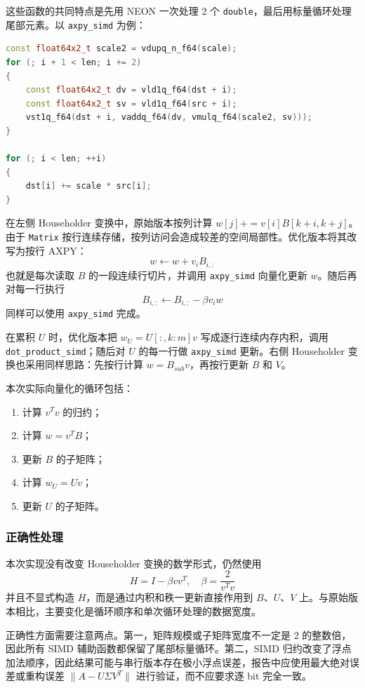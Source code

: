 \documentclass[UTF8,a4paper]{ctexart}
\begin{document}
这些函数的共同特点是先用 NEON 一次处理 2 个 \texttt{double}，最后用标量循环处理尾部元素。以 \texttt{axpy\_simd} 为例：

\begin{algorithm}[H]
\begin{lstlisting}[language=C++]
const float64x2_t scale2 = vdupq_n_f64(scale);
for (; i + 1 < len; i += 2)
{
    const float64x2_t dv = vld1q_f64(dst + i);
    const float64x2_t sv = vld1q_f64(src + i);
    vst1q_f64(dst + i, vaddq_f64(dv, vmulq_f64(scale2, sv)));
}

for (; i < len; ++i)
{
    dst[i] += scale * src[i];
}
\end{lstlisting}
\caption{bidiagonalization.cpp 中 axpy\_simd 的 SIMD 核心代码}
\label{alg:axpy-simd}
\end{algorithm}

在左侧 Householder 变换中，原始版本按列计算 $w[j] += v[i]B[k+i,k+j]$。由于 \texttt{Matrix} 按行连续存储，按列访问会造成较差的空间局部性。优化版本将其改写为按行 AXPY：
\[
  w \leftarrow w + v_i B_{i,:}
\]
也就是每次读取 $B$ 的一段连续行切片，并调用 \texttt{axpy\_simd} 向量化更新 $w$。随后再对每一行执行
\[
  B_{i,:} \leftarrow B_{i,:} - \beta v_i w
\]
同样可以使用 \texttt{axpy\_simd} 完成。

在累积 $U$ 时，优化版本把 $w_U = U[:,k:m]v$ 写成逐行连续内存内积，调用 \texttt{dot\_product\_simd}；随后对 $U$ 的每一行做 \texttt{axpy\_simd} 更新。右侧 Householder 变换也采用同样思路：先按行计算 $w = B_{sub}v$，再按行更新 $B$ 和 $V$。

本次实际向量化的循环包括：
\begin{enumerate}
  \item 计算 $v^Tv$ 的归约；
  \item 计算 $w = v^TB$；
  \item 更新 $B$ 的子矩阵；
  \item 计算 $w_U = Uv$；
  \item 更新 $U$ 的子矩阵。
\end{enumerate}

\subsubsection{正确性处理}
本次实现没有改变 Householder 变换的数学形式，仍然使用
\[
  H = I - \beta vv^T,\quad \beta = \frac{2}{v^Tv}
\]
并且不显式构造 $H$，而是通过内积和秩一更新直接作用到 $B$、$U$、$V$ 上。与原始版本相比，主要变化是循环顺序和单次循环处理的数据宽度。

正确性方面需要注意两点。第一，矩阵规模或子矩阵宽度不一定是 2 的整数倍，因此所有 SIMD 辅助函数都保留了尾部标量循环。第二，SIMD 归约改变了浮点加法顺序，因此结果可能与串行版本存在极小浮点误差，报告中应使用最大绝对误差或重构误差 $\|A-U\Sigma V^T\|$ 进行验证，而不应要求逐 bit 完全一致。
\end{document}
